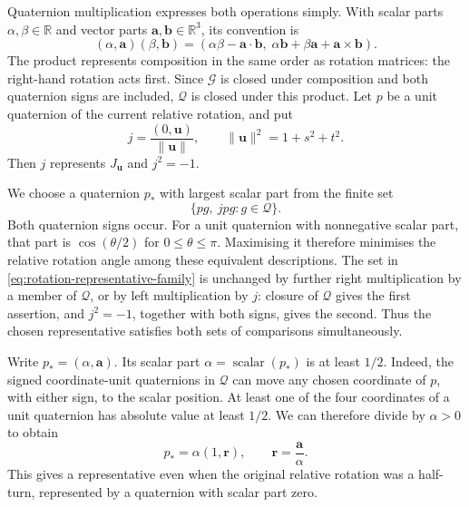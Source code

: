 Quaternion multiplication expresses both operations simply. With scalar
parts $\alpha,\beta\in\mathbb R$ and vector parts
$\mathbf a,\mathbf b\in\mathbb R^3$, its convention is
\begin{equation}\label{eq:quaternion-product}
  (\alpha,\mathbf a)(\beta,\mathbf b)
    =(\alpha\beta-\mathbf a\cdot\mathbf b,\;
      \alpha\mathbf b+\beta\mathbf a+\mathbf a\times\mathbf b).
\end{equation}
The product represents composition in the same order as rotation
matrices: the right-hand rotation acts first. Since $\mathcal G$ is closed
under composition and both quaternion signs are included, $\mathcal Q$ is
closed under this product. Let $p$ be a unit quaternion of the
current relative rotation, and put
\[
  j=\frac{(0,\mathbf u)}{\lVert\mathbf u\rVert},\qquad
  \lVert\mathbf u\rVert^2=1+s^2+t^2.
\]
Then $j$ represents $J_{\mathbf u}$ and $j^2=-1$.

We choose a quaternion $p_*$ with largest scalar part from the finite set
\begin{equation}\label{eq:rotation-representative-family}
  \{p g,\ j p g:g\in\mathcal Q\}.
\end{equation}
Both quaternion signs occur. For a unit quaternion with nonnegative
scalar part, that part is $\cos(\theta/2)$ for $0\le\theta\le\pi$.
Maximising it therefore minimises the relative rotation angle among
these equivalent descriptions.
The set in \cref{eq:rotation-representative-family} is unchanged by
further right multiplication by a member of $\mathcal Q$, or by left
multiplication by $j$: closure of $\mathcal Q$ gives the first assertion,
and $j^2=-1$, together with both signs, gives the second.
Thus the chosen representative satisfies both sets of comparisons
simultaneously.

Write $p_*=(\alpha,\mathbf a)$. Its scalar part
$\alpha=\operatorname{scalar}(p_*)$ is at least $1/2$.
Indeed, the signed coordinate-unit quaternions in $\mathcal Q$ can move
any chosen coordinate of $p$, with either sign, to the scalar position.
At least one of the four coordinates of a unit quaternion has absolute
value at least $1/2$. We can therefore divide by $\alpha>0$ to obtain
\[
  p_*=\alpha(1,\mathbf r),\qquad
  \mathbf r=\frac{\mathbf a}{\alpha}.
\]
This gives a representative even when the original relative rotation
was a half-turn, represented by a quaternion with scalar part zero.

